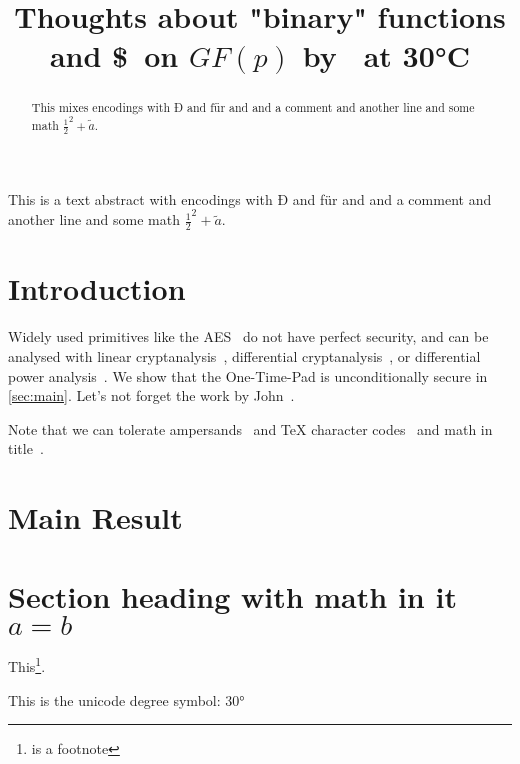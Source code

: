 \documentclass[journal=tches,version=final]{iacrj}
\title[running={Thoughts on binary functions},
       plaintext={Thoughts about "binary" functions and \$\ on $GF(p)$ by Fester Bestertester at 30°C}]
      {Thoughts about "binary" functions and \$\ on $GF(p)$ by \niceguy\ at 30°C}
\begin{document}
\maketitle

\begin{abstract}
  This mixes encodings with Ð and f\"ur and \th and a comment %
and another line and some math \(\frac{1}{2}^2 + \tilde{a}\).

  \lipsum[8]
\end{abstract}
\begin{textabstract}
This is a text abstract with encodings with Ð and f\"ur and \th and a comment %
and another line and some math \(\frac{1}{2}^2 + \tilde{a}\).
\end{textabstract}


\section{Introduction}

Widely used primitives like the AES~\cite{AES} do not have perfect
security, and can be analysed with linear
cryptanalysis~\cite{EC:Matsui93}, differential
cryptanalysis~\cite{JC:BihSha91}, or differential power
analysis~\cite{C:KocJafJun99}.  We show that the One-Time-Pad is
unconditionally secure in \autoref{sec:main}. Let's not forget
the work by John~\cite{vonNeumann}.

Note that we can tolerate ampersands~\cite{Dalheimer02} and \TeX
character codes~\cite{Bohme10} and math in
title~\cite{ACISP:MurPla19,ACISP:LYLF19,ACISP:WeiSteSha03,CCS:BHKNRS19,ACNS:DurHugVau20}.

\lipsum[9]

\section{Main Result}\label{sec:main}

\lipsum

\section{Section heading with math in it $a=b$}
\lipsum

This\footnote{is a footnote}.

This is the unicode degree symbol: 30°

\end{document}
